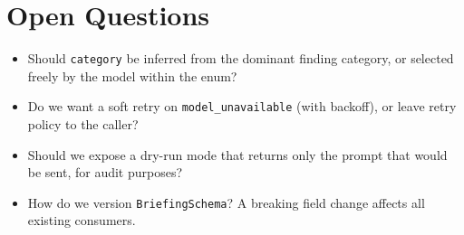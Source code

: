 \section{Open Questions}
\begin{itemize}[leftmargin=1.2em]
  \item Should \texttt{category} be inferred from the dominant finding category, or selected freely by the model within the enum?
  \item Do we want a soft retry on \texttt{model\_unavailable} (with backoff), or leave retry policy to the caller?
  \item Should we expose a dry-run mode that returns only the prompt that would be sent, for audit purposes?
  \item How do we version \texttt{BriefingSchema}? A breaking field change affects all existing consumers.
\end{itemize}


